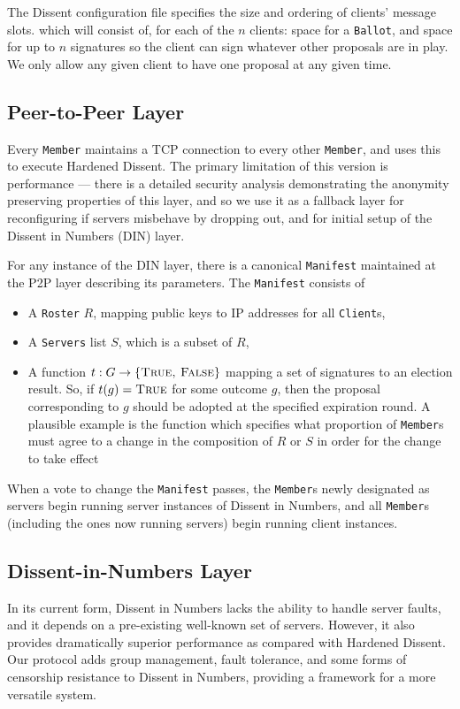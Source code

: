 The Dissent configuration file specifies the size and ordering of clients'
message slots. which will
consist of, for each of the $n$ clients: space for a \texttt{Ballot}, and space
for up to $n$ signatures so the client can sign whatever other proposals are in
play.  We only allow any given client to have one proposal at any given time.

\subsection{Peer-to-Peer Layer}
Every \texttt{Member} maintains a TCP connection to every other \texttt{Member},
and uses this to execute Hardened Dissent. The primary limitation of this
version is performance --- there is a detailed security analysis demonstrating
the anonymity preserving properties of this layer, and so we use it as a
fallback layer for reconfiguring if servers misbehave by dropping out, and for
initial setup of the Dissent in Numbers (DIN) layer.

For any instance of the DIN layer, there is a canonical \texttt{Manifest}
maintained at the P2P layer describing its parameters. The \texttt{Manifest}
consists of
\begin{itemize}
  \item A \texttt{Roster} $R$, mapping public keys to IP addresses for all
    \texttt{Client}s,
  \item A \texttt{Servers} list $S$, which is a subset of $R$,
  \item A function $t : G \to \{\textsc{True, False}\}$ mapping a set of
    signatures to an election result. So, if $t(g) = \textsc{True}$ for some
    outcome $g$, then the proposal corresponding to $g$ should
    be adopted at the specified expiration round. A plausible example is the
    function which specifies what proportion of \texttt{Member}s must agree to a
    change in the composition of $R$ or $S$ in order for the change to take
    effect
\end{itemize}

When a vote to change the \texttt{Manifest} passes, the \texttt{Member}s newly
designated as servers begin running server instances of Dissent in Numbers, and
all \texttt{Member}s (including the ones now running servers) begin running
client instances.

\subsection{Dissent-in-Numbers Layer}
In its current form, Dissent in Numbers lacks the ability to handle server
faults, and it depends on a pre-existing well-known set of servers. However, it
also provides dramatically superior performance as compared with Hardened
Dissent. Our protocol adds group management, fault tolerance, and some forms of
censorship resistance to Dissent in Numbers, providing a framework for a more
versatile system.

